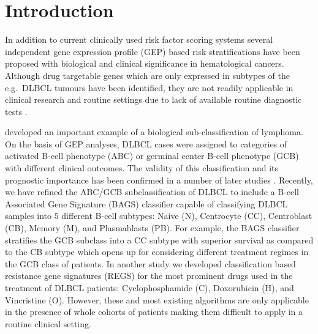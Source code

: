 \documentclass{bmcart}
\begin{document}




\section{Introduction}
In addition to current clinically used risk factor scoring systems several independent gene expression profile (GEP) based risk stratifications have been proposed with biological and clinical significance in hematological cancers.
Although drug targetable genes which are only expressed in subtypes of the e.g.\ DLBCL tumours have been identified, they are not readily applicable in clinical research and routine settings due to lack of available routine diagnostic tests \citep{Jaffe2009, Sehn2014}.

\citet{Alizadeh2000} developed an important example of a biological sub-classification of lymphoma.
On the basis of GEP analyses, DLBCL cases were assigned to categories of activated B-cell phenotype (ABC) or germinal center B-cell phenotype (GCB) with different clinical outcomes.
The validity of this classification and its prognostic importance has been confirmed in a number of later studies \citep{Rosenwald2002a,Hans2004,Poulsen2005,Lenz2008a,Monti2012a}.
Recently, we have refined the ABC/GCB subclassification of DLBCL to include a B-cell Associated Gene Signature (BAGS) classifier \citep{DybkaerBoegsted2015} capable of classifying DLBCL samples into $5$ different B-cell subtypes:
Naive (N), Centrocyte (CC), Centroblast (CB), Memory (M), and Plasmablasts (PB).
For example, the BAGS classifier stratifies the GCB subclass into a CC subtype with superior survival as compared to the CB subtype \citep{DybkaerBoegsted2015} which opens up for considering different treatment regimes in the GCB class of patients.
In another study \citep{Falgreen2015} we developed classification based resistance gene signatures (REGS) for the most prominent drugs used in the treatment of DLBCL patients:
Cyclophosphamide (C), Doxorubicin (H), and Vincristine (O).
However, these and most existing algorithms are only applicable in the presence of whole cohorts of patients making them difficult to apply in a routine clinical setting.
\end{document}
